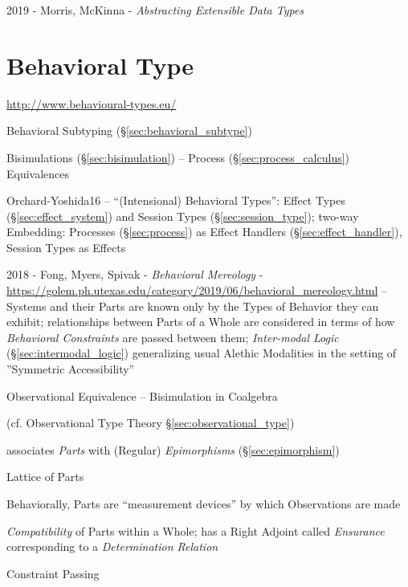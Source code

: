 2019 - Morris, McKinna - \emph{Abstracting Extensible Data Types}



\section{Behavioral Type}\label{sec:behavioral_type}

\url{http://www.behavioural-types.eu/}

\fist Behavioral Subtyping (\S\ref{sec:behavioral_subtype})

\fist Bisimulations (\S\ref{sec:bisimulation}) -- Process
(\S\ref{sec:process_calculus}) Equivalences

Orchard-Yoshida16 \cite{orchard-yoshida16} -- ``(Intensional)
Behavioral Types'': Effect Types (\S\ref{sec:effect_system}) and
Session Types (\S\ref{sec:session_type}); two-way Embedding: Processes
(\S\ref{sec:process}) as Effect Handlers (\S\ref{sec:effect_handler}),
Session Types as Effects

\asterism


2018 - Fong, Myers, Spivak - \emph{Behavioral Mereology} -
\url{https://golem.ph.utexas.edu/category/2019/06/behavioral_mereology.html} --
Systems and their Parts are known only by the Types of Behavior they can
exhibit; relationships between Parts of a Whole are considered in terms of how
\emph{Behavioral Constraints} are passed between them; \emph{Inter-modal Logic}
(\S\ref{sec:intermodal_logic}) generalizing usual Alethic Modalities in the
setting of ''Symmetric Accessibility''

Observational Equivalence -- Bisimulation in Coalgebra

(cf. Observational Type Theory \S\ref{sec:observational_type})

associates \emph{Parts} with (Regular) \emph{Epimorphisms}
(\S\ref{sec:epimorphism})

Lattice of Parts

Behaviorally, Parts are ``measurement devices'' by which Observations are made

\emph{Compatibility} of Parts within a Whole; has a Right Adjoint called
\emph{Ensurance} corresponding to a \emph{Determination Relation}

Constraint Passing

